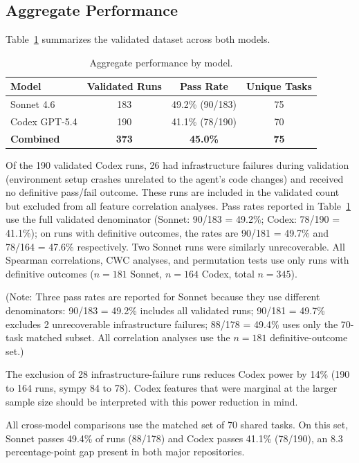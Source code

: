 \documentclass[11pt]{article}
\begin{document}
\subsection{Aggregate Performance}

Table~\ref{tab:aggregate} summarizes the validated dataset across both models.

\begin{table}[t]
\centering
\caption{Aggregate performance by model.}
\label{tab:aggregate}
\begin{tabular}{lccc}
\toprule
\textbf{Model} & \textbf{Validated Runs} & \textbf{Pass Rate} & \textbf{Unique Tasks} \\
\midrule
Sonnet 4.6     & 183 & 49.2\% (90/183) & 75 \\
Codex GPT-5.4  & 190 & 41.1\% (78/190) & 70 \\
\midrule
\textbf{Combined} & \textbf{373} & \textbf{45.0\%} & \textbf{75} \\
\bottomrule
\end{tabular}
\end{table}

Of the 190 validated Codex runs, 26 had infrastructure failures during validation (environment setup crashes unrelated to the agent's code changes) and received no definitive pass/fail outcome.
These runs are included in the validated count but excluded from all feature correlation analyses.
Pass rates reported in Table~\ref{tab:aggregate} use the full validated denominator (Sonnet: 90/183 = 49.2\%; Codex: 78/190 = 41.1\%); on runs with definitive outcomes, the rates are 90/181 = 49.7\% and 78/164 = 47.6\% respectively.
Two Sonnet runs were similarly unrecoverable.
All Spearman correlations, CWC analyses, and permutation tests use only runs with definitive outcomes ($n = 181$ Sonnet, $n = 164$ Codex, total $n = 345$).

(Note: Three pass rates are reported for Sonnet because they use different denominators: 90/183 = 49.2\% includes all validated runs; 90/181 = 49.7\% excludes 2 unrecoverable infrastructure failures; 88/178 = 49.4\% uses only the 70-task matched subset.
All correlation analyses use the $n = 181$ definitive-outcome set.)

The exclusion of 28 infrastructure-failure runs reduces Codex power by 14\% (190 to 164 runs, sympy 84 to 78).
Codex features that were marginal at the larger sample size should be interpreted with this power reduction in mind.

All cross-model comparisons use the matched set of 70 shared tasks.
On this set, Sonnet passes 49.4\% of runs (88/178) and Codex passes 41.1\% (78/190), an 8.3 percentage-point gap present in both major repositories.
\end{document}
